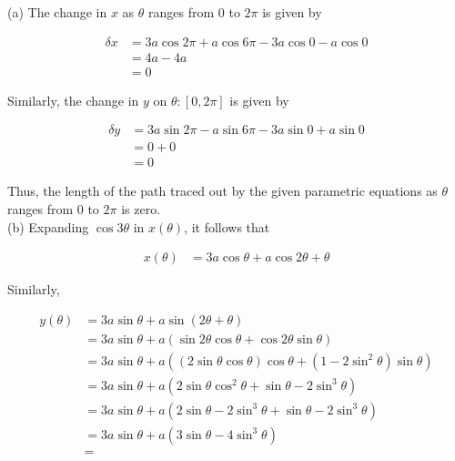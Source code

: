 \documentclass{article}
\begin{document}
    (a) The change in $x$ as $\theta$ ranges from 0 to $2\pi$ is given by

    \begin{align*}
        \delta x    &= 3a\cos{2\pi} + a\cos{6\pi} - 3a\cos{0} - a\cos{0} \\
                    &= 4a - 4a \\
                    &= 0
    \end{align*}

    Similarly, the change in $y$ on $\theta:[0,2\pi]$ is given by

    \begin{align*}
        \delta y    &= 3a\sin{2\pi} - a\sin{6\pi} - 3a\sin{0} + a\sin{0} \\
                    &= 0 + 0 \\
                    &= 0
    \end{align*}

    Thus, the length of the path traced out by the given parametric equations as $\theta$ ranges from $0$ to $2\pi$ is zero. \\

    (b) Expanding $\cos{3\theta}$ in $x(\theta)$, it follows that

    \begin{align*}
        x(\theta)   &= 3a\cos{\theta} + a\cos{2\theta + \theta}
    \end{align*}

    Similarly,

    \begin{align*}
        y(\theta)   &= 3a\sin{\theta} + a\sin{(2\theta+\theta)} \\
                    &= 3a\sin{\theta} + a\left(\sin{2\theta}\cos{\theta} + \cos{2\theta}\sin{\theta}\right) \\
                    &= 3a\sin{\theta} + a\left(\left(2\sin{\theta}\cos{\theta}\right)\cos{\theta} + \left(1-2\sin^2{\theta}\right)\sin{\theta}\right) \\
                    &= 3a\sin{\theta} + a\left(2\sin{\theta}\cos^2{\theta} + \sin{\theta} - 2\sin^3{\theta}\right) \\
                    &= 3a\sin{\theta} + a\left(2\sin{\theta} - 2\sin^3{\theta} + \sin{\theta} - 2\sin^3{\theta}\right) \\
                    &= 3a\sin{\theta} + a\left(3\sin{\theta} - 4\sin^3{\theta}\right) \\
                    &=
    \end{align*}
\end{document}
